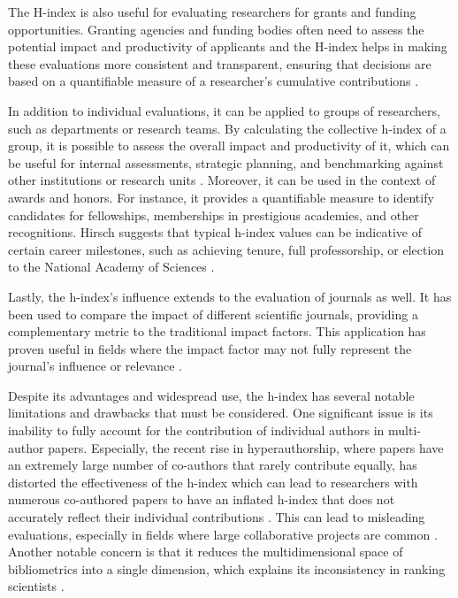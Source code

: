 The H-index is also useful for evaluating researchers for grants and funding
opportunities. Granting agencies and funding bodies often need to assess the
potential impact and productivity of applicants and the H-index helps in making
these evaluations more consistent and transparent, ensuring that decisions are
based on a quantifiable measure of a researcher's cumulative contributions
\cite{hirsch2005index,bornmann2007what,costas2007h,waltman2012inconsistency,hirsch2014meaning,koltun2021h}.

In addition to individual evaluations, it can be applied to groups of
researchers, such as departments or research teams. By calculating the
collective h-index of a group, it is possible to assess the overall impact and
productivity of it, which can be useful for internal assessments, strategic
planning, and benchmarking against other institutions or research units
\cite{hirsch2005index,bornmann2007what,costas2007h,waltman2012inconsistency,egghe2010hirsch,hirsch2014meaning,koltun2021h}.
Moreover, it can be used in the context of awards and honors. For instance, it
provides a quantifiable measure to identify candidates for fellowships,
memberships in prestigious academies, and other recognitions. Hirsch suggests
that typical h-index values can be indicative of certain career milestones,
such as achieving tenure, full professorship, or election to the National
Academy of Sciences
\cite{hirsch2005index,bornmann2007what,costas2007h,waltman2012inconsistency,egghe2010hirsch,hirsch2014meaning}.

Lastly, the h-index's influence extends to the evaluation of journals as well.
It has been used to compare the impact of different scientific journals,
providing a complementary metric to the traditional impact factors. This
application has proven useful in fields where the impact factor may not fully
represent the journal's influence or relevance \cite{norris2010h}.

Despite its advantages and widespread use, the h-index has several notable
limitations and drawbacks that must be considered. One significant issue is its
inability to fully account for the contribution of individual authors in
multi-author papers. Especially, the recent rise in hyperauthorship, where
papers have an extremely large number of co-authors that rarely contribute
equally, has distorted the effectiveness of the h-index which can lead to
researchers with numerous co-authored papers to have an inflated h-index that
does not accurately reflect their individual contributions
\cite{koltun2021h,bihari2018}. This can lead to misleading evaluations,
especially in fields where large collaborative projects are common
\cite{hirsch2005index,bornmann2007what,costas2007h,waltman2012inconsistency,norris2010h,egghe2010hirsch,hirsch2014meaning}.
Another notable concern is that it reduces the multidimensional space of
bibliometrics into a single dimension, which explains its inconsistency in
ranking scientists \cite{bornmann2007what}.

